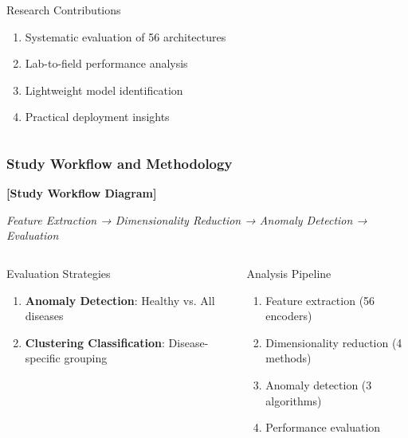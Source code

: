 \documentclass[aspectratio=43]{beamer}
\begin{document}
\begin{frame}
\begin{columns}
\begin{column}{0.5\textwidth}
            \begin{block}{Research Contributions}
                \begin{enumerate}
                    \item Systematic evaluation of 56 architectures
                    \item Lab-to-field performance analysis
                    \item Lightweight model identification
                    \item Practical deployment insights
                \end{enumerate}
            \end{block}
        \end{column}
    \end{columns}
\end{frame}

\begin{frame}
    \frametitle{Study Workflow and Methodology}
    
    \begin{center}
        \textbf{[Study Workflow Diagram]}
        
        \vspace{0.5cm}
        \textit{Feature Extraction → Dimensionality Reduction → Anomaly Detection → Evaluation}
    \end{center}
    
    \begin{columns}
        \begin{column}{0.5\textwidth}
            \begin{block}{Evaluation Strategies}
                \begin{enumerate}
                    \item \textbf{Anomaly Detection}: Healthy vs. All diseases
                    \item \textbf{Clustering Classification}: Disease-specific grouping
                \end{enumerate}
            \end{block}
        \end{column}
        
        \begin{column}{0.5\textwidth}
            \begin{exampleblock}{Analysis Pipeline}
                \begin{enumerate}
                    \item Feature extraction (56 encoders)
                    \item Dimensionality reduction (4 methods)
                    \item Anomaly detection (3 algorithms)
                    \item Performance evaluation
                \end{enumerate}
            \end{exampleblock}
        \end{column}
    \end{columns}
\end{frame}
\end{document}
